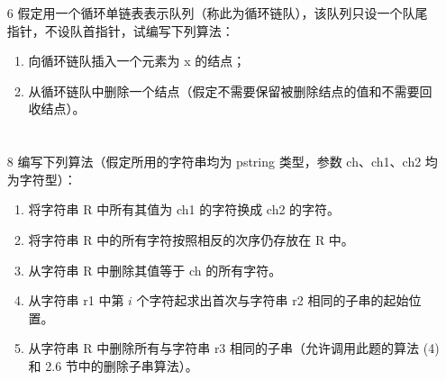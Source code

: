 \documentclass[UTF8]{ctexart}
\begin{document}
\begin{enumerate}
\item[6] 假定用一个循环单链表表示队列（称此为循环链队），该队列只设一个队尾指针，不设队首指针，试编写下列算法：
\begin{enumerate}
	\item 向循环链队插入一个元素为 x 的结点；
	\item 从循环链队中删除一个结点（假定不需要保留被删除结点的值和不需要回收结点）。
\end{enumerate}

\end{enumerate}
\section{}
\begin{enumerate}
	
	\item[8] 编写下列算法（假定所用的字符串均为 pstring 类型，参数 ch、ch1、ch2 均为字符型）：
	\begin{enumerate}
		\item 将字符串 R 中所有其值为 ch1 的字符换成 ch2 的字符。
		\item 将字符串 R 中的所有字符按照相反的次序仍存放在 R 中。
		\item 从字符串 R 中删除其值等于 ch 的所有字符。
		\item 从字符串 r1 中第 $i$ 个字符起求出首次与字符串 r2 相同的子串的起始位置。
		\item 从字符串 R 中删除所有与字符串 r3 相同的子串（允许调用此题的算法 (4) 和 2.6 节中的删除子串算法）。
	\end{enumerate}
	
\end{enumerate}
\end{document}
